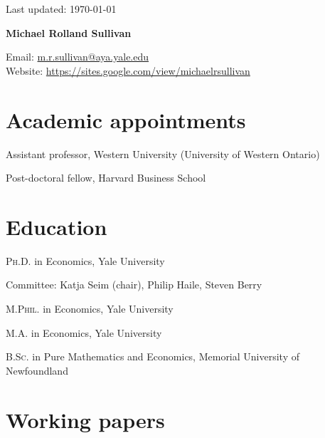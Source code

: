 \documentclass[11pt]{article} %
\begin{document}
 \begin{flushright}
   \scriptsize
	Last updated: \today
   \normalsize
\end{flushright}
{\LARGE\bfseries Michael Rolland Sullivan} %
\bigskip\bigskip\medskip %

\medskip %

Email: \href{mailto:m.r.sullivan@yale.edu}{m.r.sullivan@aya.yale.edu}\\ 
Website: \href{https://sites.google.com/view/michaelrsullivan/home}{https://sites.google.com/view/michaelrsullivan}\\ 

%

\section*{Academic appointments}

 Assistant professor, Western University (University of Western Ontario) 

 Post-doctoral fellow, Harvard Business School


\section*{Education}

\textsc{Ph.D.} in Economics, Yale University  

\hspace{1cm} \small Committee: Katja Seim (chair), Philip Haile, Steven Berry \normalsize

\textsc{M.Phil.} in Economics, Yale University 

\textsc{M.A.} in Economics, Yale University 

\textsc{B.Sc.} in Pure Mathematics and Economics, Memorial University of Newfoundland

\section*{Working papers}
\end{document}
